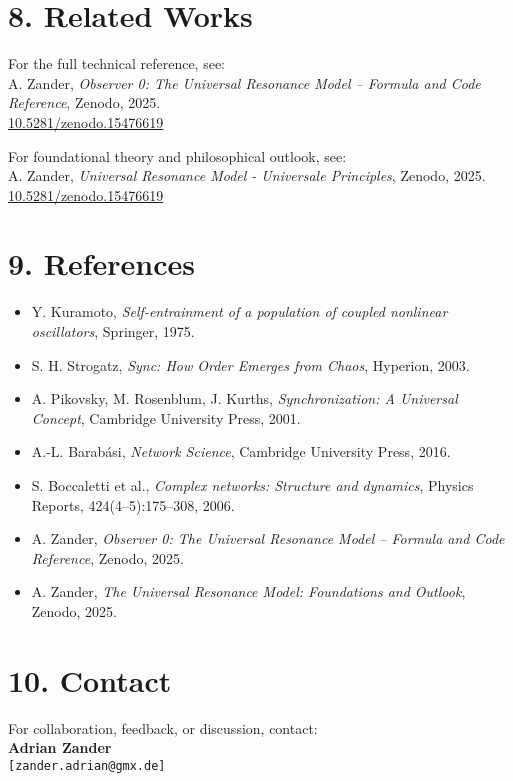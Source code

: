 \documentclass{article}
\begin{document}
\section*{8. Related Works}

For the full technical reference, see:\\
A. Zander, \textit{Observer 0: The Universal Resonance Model – Formula and Code Reference}, Zenodo, 2025. \\
\url{10.5281/zenodo.15476619}

\vspace{1em}
For foundational theory and philosophical outlook, see:\\
A. Zander, \textit{Universal Resonance Model - Universale Principles}, Zenodo, 2025. \\
\url{10.5281/zenodo.15476619}

\section*{9. References}
\begin{itemize}
    \item Y. Kuramoto, \textit{Self-entrainment of a population of coupled nonlinear oscillators}, Springer, 1975.
    \item S. H. Strogatz, \textit{Sync: How Order Emerges from Chaos}, Hyperion, 2003.
    \item A. Pikovsky, M. Rosenblum, J. Kurths, \textit{Synchronization: A Universal Concept}, Cambridge University Press, 2001.
    \item A.-L. Barabási, \textit{Network Science}, Cambridge University Press, 2016.
    \item S. Boccaletti et al., \textit{Complex networks: Structure and dynamics}, Physics Reports, 424(4–5):175–308, 2006.
    \item A. Zander, \textit{Observer 0: The Universal Resonance Model – Formula and Code Reference}, Zenodo, 2025.
    \item A. Zander, \textit{The Universal Resonance Model: Foundations and Outlook}, Zenodo, 2025.
\end{itemize}

\section*{10. Contact}

For collaboration, feedback, or discussion, contact:\\
\textbf{Adrian Zander}\\
\texttt{[zander.adrian@gmx.de]}
\end{document}
